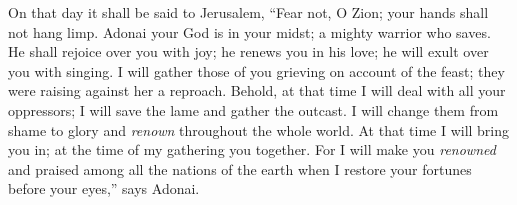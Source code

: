 \begin{biblechapter}
\verse On that day it shall be said to Jerusalem, 
“Fear not, O Zion; 
your hands shall not hang limp.
\verse Adonai your God is in your midst; 
a mighty warrior who saves. 
He shall rejoice over you with joy; 
he renews you in his love; 
he will exult over you with singing.
\verse I will gather those of you grieving on account of the feast; 
they were raising against her a reproach.
\verse Behold, at that time I will deal with all your oppressors; 
I will save the lame and gather the outcast. 
I will change them from shame 
to glory and \textit{renown} throughout the whole world.
\verse At that time I will bring you in; 
at the time of my gathering you together. 
For I will make you \textit{renowned} and praised 
among all the nations of the earth 
when I restore your fortunes before your eyes,” 
says Adonai.
\end{biblechapter}

